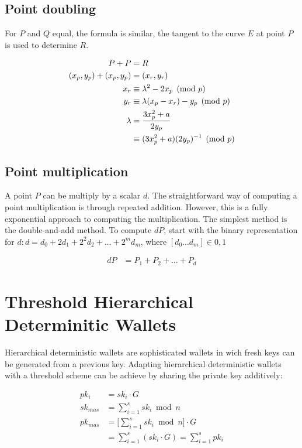 \subsection{Point doubling}
For $P$ and $Q$ equal, the formula is similar, the tangent to the curve $E$ at
point $P$ is used to determine $R$.

\begin{equation*}
\begin{split}
  P + P &= R \\
  (x_p, y_p) + (x_p, y_p) &= (x_r, y_r) \\
  x_r &\equiv \lambda^2 - 2x_p \pmod p \\
  y_r &\equiv \lambda(x_p - x_r) - y_p \pmod p  \\
  \lambda &= \cfrac{3x_p^2 + a}{2y_p} \\
          &\equiv (3x_p^2 + a)(2y_p)^{-1} \pmod p
\end{split}
\end{equation*}

\subsection{Point multiplication}
A point $P$ can be multiply by a scalar $d$. The straightforward way of computing
a point multiplication is through repeated addition. However, this is a fully
exponential approach to computing the multiplication.
The simplest method is the double-and-add method. To compute $dP$, start with the
binary representation for $d : d = d_0 + 2d_1 + 2^2d_2 + \dots + 2^md_m$,
where $[ d_0 \dots d_m] \in {0,1}$

\begin{equation*}
\begin{split}
  dP &= P_1 + P_2 + \dots + P_d
\end{split}
\end{equation*}

\section{Threshold Hierarchical Determinitic Wallets}

Hierarchical deterministic wallets are sophisticated wallets in wich fresh keys
can be generated from a previous key. Adapting hierarchical deterministic wallets
with a threshold scheme can be achieve by sharing the private key additively:

\begin{equation*}
\begin{split}
  pk_i     &= sk_i \cdot G \\
  sk_{mas} &= \sum_{i=1}^{s} sk_i \bmod n \\
  pk_{mas} &= \Bigg[ \sum_{i=1}^{s} sk_i \bmod n \Bigg] \cdot G \\
           &= \sum_{i=1}^{s} (sk_i \cdot G) = \sum_{i=1}^{s} pk_i
\end{split}
\end{equation*}

